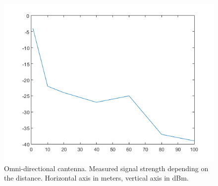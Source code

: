 \begin{figure}
\begin{center}
		\includegraphics[width=\figurewidth]{plots/omni_p.png}
		\caption{Omni-directional cantenna. Measured signal strength depending on the distance. Horizontal axis in meters, vertical axis in dBm.}
		\label{img:dist:pow:omni}
	\end{center}\end{figure}
	
